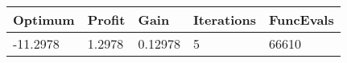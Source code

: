 \begin{tabular}{lllll}
Optimum & Profit & Gain & Iterations & FuncEvals \\ 
\hline 
-11.2978 & 1.2978 & 0.12978 & 5 & 66610 \\ 
\hline 
\end{tabular}